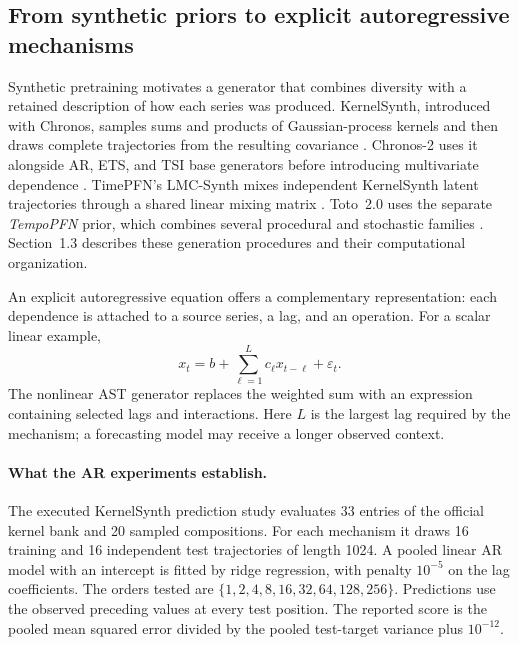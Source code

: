 \subsection{From synthetic priors to explicit autoregressive mechanisms}
\label{sec:generator-ar-motivation}

Synthetic pretraining motivates a generator that combines diversity with a
retained description of how each series was produced. KernelSynth, introduced
with Chronos, samples sums and products of Gaussian-process kernels and then
draws complete trajectories from the resulting covariance
\citep[Section~4.2]{ansari2024chronos}. Chronos-2 uses it alongside AR, ETS, and
TSI base generators before introducing multivariate dependence
\citep{ansari2025chronos2}. TimePFN's LMC-Synth mixes independent KernelSynth
latent trajectories through a shared linear mixing matrix
\citep{taga2025timepfn}. Toto~2.0 uses the separate \emph{TempoPFN} prior,
which combines several procedural and stochastic families
\citep{moroshan2025tempopfn,khwaja2026toto2}. Section~1.3 describes these
generation procedures and their computational organization.

An explicit autoregressive equation offers a complementary representation:
each dependence is attached to a source series, a lag, and an operation.
For a scalar linear example,
\begin{equation}
 x_t=b+\sum_{\ell=1}^{L}c_{\ell}x_{t-\ell}+\varepsilon_t.
 \label{eq:implemented-ar}
\end{equation}
The nonlinear AST generator replaces the weighted sum with an expression
containing selected lags and interactions. Here $L$ is the largest lag required
by the mechanism; a forecasting model may receive a longer observed context.

\paragraph{What the AR experiments establish.}
The executed KernelSynth prediction study evaluates 33 entries of the official
kernel bank and 20 sampled compositions. For each mechanism it draws 16 training
and 16 independent test trajectories of length 1024. A pooled linear AR model
with an intercept is fitted by ridge regression, with penalty $10^{-5}$ on
the lag coefficients. The orders tested are
$\{1,2,4,8,16,32,64,128,256\}$. Predictions use the observed preceding values
at every test position. The reported score is the pooled mean squared error
divided by the pooled test-target variance plus $10^{-12}$.

